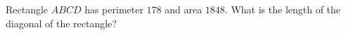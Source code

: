 Rectangle $ABCD$ has perimeter $178$ and area $1848$. What is the length of the diagonal of the rectangle?